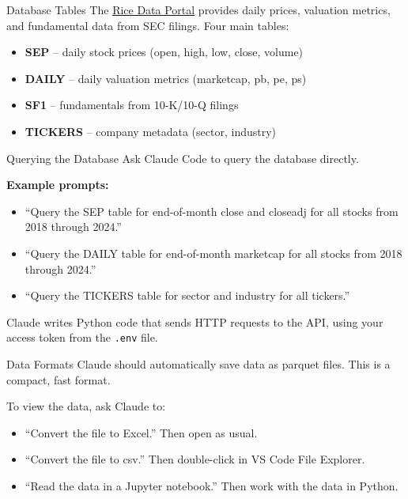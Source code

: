 \documentclass[aspectratio=169,t]{beamer}
\begin{document}
\begin{frame}{Database Tables}
The \href{https://data-portal.rice-business.org}{Rice Data Portal} provides daily prices, valuation metrics, and fundamental data from SEC filings. Four main tables:

\begin{itemize}
\item \textbf{SEP} -- daily stock prices (open, high, low, close, volume)
\item \textbf{DAILY} -- daily valuation metrics (marketcap, pb, pe, ps)
\item \textbf{SF1} -- fundamentals from 10-K/10-Q filings
\item \textbf{TICKERS} -- company metadata (sector, industry)
\end{itemize}
\end{frame}

\begin{frame}{Querying the Database}
Ask Claude Code to query the database directly.

\vspace{0.3cm}
\textbf{Example prompts:}
\begin{itemize}
\item ``Query the SEP table for end-of-month close and closeadj for all stocks from 2018 through 2024.''
\item ``Query the DAILY table for end-of-month marketcap for all stocks from 2018 through 2024.''
\item ``Query the TICKERS table for sector and industry for all tickers.''
\end{itemize}

\vspace{0.15cm}
Claude writes Python code that sends HTTP requests to the API, using your access token from the \texttt{.env} file.
\end{frame}

\begin{frame}{Data Formats}
Claude should automatically save data as parquet files.  This is a compact, fast format.

\vspace{0.3cm}
To view the data, ask Claude to:
\begin{itemize}
\item \alert{``Convert the file to Excel.''} Then open as usual.
\item \alert{``Convert the file to csv.''} Then double-click in VS Code File Explorer.
\item \alert{``Read the data in a Jupyter notebook.''} Then work with the data in Python.
\end{itemize}
\end{frame}
\end{document}
